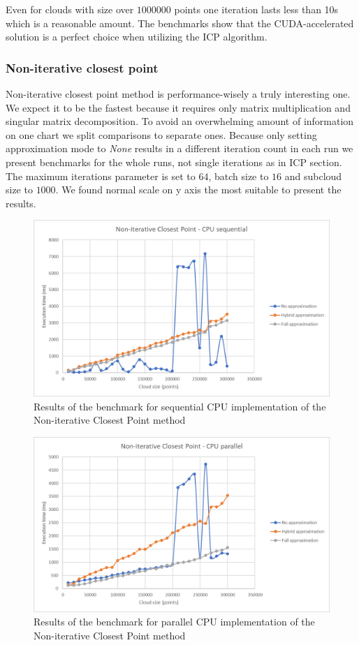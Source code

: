 \documentclass[titlepage]{article}
\begin{document}
Even for clouds with size over $1000000$ points one iteration lasts less than 10s which is a reasonable amount. The benchmarks show that the CUDA-accelerated solution is a perfect choice when utilizing the ICP algorithm.

\subsubsection{Non-iterative closest point}
Non-iterative closest point method is performance-wisely a truly interesting one. We expect it to be the fastest because it requires only matrix multiplication and singular matrix decomposition. To avoid an overwhelming amount of information on one chart we split comparisons to separate ones. Because only setting approximation mode to \textit{None} results in a different iteration count in each run we present benchmarks for the whole runs, not single iterations as in ICP section. The maximum iterations parameter is set to $64$, batch size to $16$ and subcloud size to $1000$. We found normal scale on y axis the most suitable to present the results.

\begin{figure}[H]
\includegraphics[width=\textwidth]{ms-nicp-1.png}
\caption{Results of the benchmark for sequential CPU implementation of the Non-iterative Closest Point method}
\end{figure}

\begin{figure}[H]
\includegraphics[width=\textwidth]{ms-nicp-2.png}
\caption{Results of the benchmark for parallel CPU implementation of the Non-iterative Closest Point method}
\end{figure}
\end{document}
